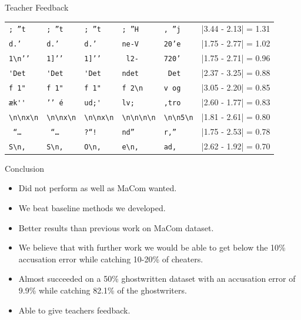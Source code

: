 \documentclass[10pt]{beamer}
\begin{document}
\begin{frame}[fragile]{Teacher Feedback}
\begin{center}
\begin{tabular}{lll|lll}
            \verb[; ”t[       & \verb[; ”t[       & \verb[; ”t[          &
            \verb'; ”H'       & \verb', ”j'       & |3.44 - 2.13| = 1.31 \\

            \verb[d.’ [       & \verb[d.’ [       & \verb[d.’ [          &
            \verb'ne-V'       & \verb'20’e'       & |1.75 - 2.77| = 1.02 \\

            \verb[1\n’’[      & \verb[1]’’[       & \verb[1]’’[          &
            \verb' l2-'       & \verb'720’'       & |1.75 - 2.71| = 0.96 \\

            \verb['Det[       & \verb['Det[       & \verb['Det[          &
            \verb'ndet'       & \verb' Det'       & |2.37 - 3.25| = 0.88 \\

            \verb[f 1"[       & \verb[f 1"[       & \verb[f 1"[          &
            \verb'f 2\n'      & \verb'v og'       & |3.05 - 2.20| = 0.85 \\

            \verb[æk''[       & \verb[’’ é[       & \verb[ud;'[          &
            \verb'lv; '       & \verb',tro'       & |2.60 - 1.77| = 0.83 \\

            \verb[\n\nx\n[    & \verb[\n\nx\n[    & \verb[\n\nx\n[       &
            \verb'\n\n\n\n'   & \verb'\n\n5\n'    & |1.81 - 2.61| = 0.80 \\
            \verb[ “… [       & \verb[ “… [       & \verb[?“! [          &
            \verb'nd” '       & \verb'r,” '       & |1.75 - 2.53| = 0.78 \\

            \verb[S\n, [      & \verb[S\n, [      & \verb[O\n, [         &
            \verb'e\n, '      & \verb'ad, '       & |2.62 - 1.92| = 0.70 \\
        \end{tabular}
    \end{center}
\end{frame}

\begin{frame}[fragile]{Conclusion}
    \begin{itemize}
        \item Did not perform as well as MaCom wanted.
        \item We beat baseline methods we developed.
        \item Better results than previous work on MaCom dataset.
        \item We believe that with further work we would be able to get below
            the 10\% accusation error while catching 10-20\% of cheaters.
        \item Almost succeeded on a 50\% ghostwritten dataset with an accusation
            error of 9.9\% while catching 82.1\% of the ghostwriters.
        \item Able to give teachers feedback.
    \end{itemize}
\end{frame}
\end{document}
